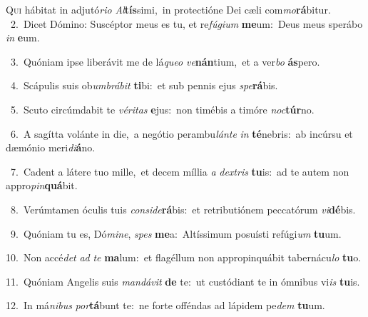 \lettrine{\initial\textcolor{\initialcolor}{Q}}{ui} hábitat in adjutó\-\textit{ri}\-\textit{o} \textit{Al}\-\textbf{tís}simi,~\star in protectióne Dei cæli com\-\textit{mo}\-\textbf{rá}bitur.\\
{\numbfont\textcolor{\numbcolor}{~2.}}~Dicet Dómino: Suscéptor meus es tu, et re\-\textit{fú}\-\textit{gi}\textit{um} \textbf{me}\-um:~\star Deus meus sperábo \textit{in} \textbf{e}\-um.\par
{\numbfont\textcolor{\numbcolor}{~3.}}~Quóniam ipse liberávit me de lá\-\textit{que}\-\textit{o} \textit{ve}\-\textbf{nán}tium,~\star et a ver\textit{bo} \textbf{ás}\-pero.\par
{\numbfont\textcolor{\numbcolor}{~4.}}~Scápulis suis ob\-\textit{um}\-\textit{brá}\textit{bit} \textbf{ti}\-bi:~\star et sub pennis ejus \textit{spe}\-\textbf{rá}bis.\par
{\numbfont\textcolor{\numbcolor}{~5.}}~Scuto circúmdabit te \textit{vé}\-\textit{ri}\textit{tas} \textbf{e}\-jus:~\star non timébis a timóre \textit{noc}\-\textbf{túr}no.\par
{\numbfont\textcolor{\numbcolor}{~6.}}~A sagítta volánte in die,~\dagger a negótio perambu\-\textit{lán}\-\textit{te} \textit{in} \textbf{té}\-nebris:~\star ab incúrsu et dæmónio meri\-\textit{di}\-\textbf{á}no.\par
{\numbfont\textcolor{\numbcolor}{~7.}}~Cadent a látere tuo mille,~\dagger et decem míllia \textit{a} \textit{dex}\-\textit{tris} \textbf{tu}\-is:~\star ad te autem non appro\-\textit{pin}\-\textbf{quá}bit.\par
{\numbfont\textcolor{\numbcolor}{~8.}}~Verúmtamen óculis tuis \textit{con}\-\textit{si}\textit{de}\textbf{rá}bis:~\star et retributiónem peccatórum \textit{vi}\-\textbf{dé}bis.\par
{\numbfont\textcolor{\numbcolor}{~9.}}~Quóniam tu es, Dó\-\textit{mi}\-\textit{ne}, \textit{spes} \textbf{me}\-a:~\star Altíssimum posuísti refúgi\textit{um} \textbf{tu}\-um.\par
{\numbfont\textcolor{\numbcolor}{10.}}~Non accé\textit{det} \textit{ad} \textit{te} \textbf{ma}\-lum:~\star et flagéllum non appropinquábit tabernácu\textit{lo} \textbf{tu}\-o.\par
{\numbfont\textcolor{\numbcolor}{11.}}~Quóniam Angelis suis \textit{man}\-\textit{dá}\textit{vit} \textbf{de} te:~\star ut custódiant te in ómnibus vi\textit{is} \textbf{tu}\-is.\par
{\numbfont\textcolor{\numbcolor}{12.}}~In má\-\textit{ni}\-\textit{bus} \textit{por}\-\textbf{tá}bunt te:~\star ne forte offéndas ad lápidem pe\textit{dem} \textbf{tu}\-um.\par
